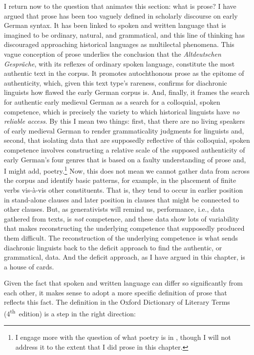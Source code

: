 I return now to the question that animates this section: what is prose? I have argued that prose has been too vaguely defined in scholarly discourse on early German syntax. It has been linked to spoken and written language that is imagined to be ordinary, natural, and grammatical, and this line of thinking has discouraged approaching historical languages as multilectal phenomena. This vague conception of prose underlies the conclusion that the \textit{Altdeutschen Gespräche}, with its reflexes of ordinary spoken language, constitute the most authentic text in the corpus. It promotes autochthonous prose as the epitome of authenticity, which, given this text type’s rareness, confirms for diachronic linguists how flawed the early German corpus is. And, finally, it frames the search for authentic early medieval German as a search for a colloquial, spoken competence, which is precisely the variety to which historical linguists have \textit{no reliable access}. By this I mean two things: first, that there are no living speakers of early medieval German to render grammaticality judgments for linguists and, second, that isolating data that are supposedly reflective of this colloquial, spoken competence involves constructing a relative scale of the supposed authenticity of early German’s four genres that is based on a faulty understanding of prose and, I might add, poetry.\footnote{{I engage more with the question of what poetry is in , though I will not address it to the extent that I did prose in this chapter.} } Now, this does not mean we cannot gather data from across the corpus and identify basic patterns, for example, in the placement of finite verbs vis-à-vis other constituents. That is, they tend to occur in earlier position in stand-alone clauses and later position in clauses that might be connected to other clauses. But, as generativists will remind us, performance, i.e., data gathered from texts, is \textit{not} competence, and these data show lots of variability that makes reconstructing the underlying competence that supposedly produced them difficult. The reconstruction of the underlying competence is what sends diachronic linguists back to the deficit approach to find the authentic, or grammatical, data. And the deficit approach, as I have argued in this chapter, is a house of cards.

Given the fact that spoken and written language can differ so significantly from each other, it makes sense to adopt a more specific definition of prose that reflects this fact. The definition in the Oxford Dictionary of Literary Terms (4\textsuperscript{th}~edition) is a step in the right direction:

